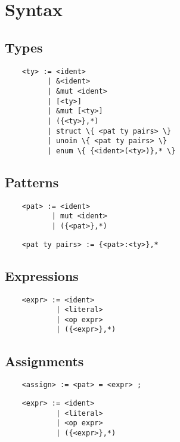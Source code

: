 \documentclass[a4paper]{article}
\begin{document}
\pagebreak

\section{Syntax}

\subsection{Types}

\begin{verbatim}
    <ty> := <ident>
          | &<ident>
          | &mut <ident>
          | [<ty>]
          | &mut [<ty>]
          | ({<ty>},*)
          | struct \{ <pat ty pairs> \}
          | unoin \{ <pat ty pairs> \}
          | enum \{ {<ident>(<ty>)},* \}
\end{verbatim}

\subsection{Patterns}

\begin{verbatim}
    <pat> := <ident>
           | mut <ident>
           | ({<pat>},*)
\end{verbatim}

\begin{verbatim}
    <pat ty pairs> := {<pat>:<ty>},*
\end{verbatim}

\subsection{Expressions}

\begin{verbatim}
    <expr> := <ident>
            | <literal>
            | <op expr>
            | ({<expr>},*)
\end{verbatim}

\subsection{Assignments}

\begin{verbatim}
    <assign> := <pat> = <expr> ;
\end{verbatim}

\begin{verbatim}
    <expr> := <ident>
            | <literal>
            | <op expr>
            | ({<expr>},*)
\end{verbatim}
\end{document}
